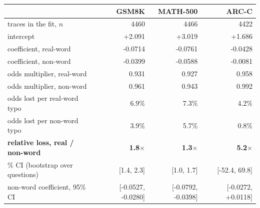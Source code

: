 \begin{tabular}{lrrr}
\toprule
& \textbf{GSM8K} & \textbf{MATH-500} & \textbf{ARC-C} \\
\midrule
traces in the fit, $n$ & 4460 & 4466 & 4422 \\
intercept & +2.091 & +3.019 & +1.686 \\
coefficient, real-word & -0.0714 & -0.0761 & -0.0428 \\
coefficient, non-word & -0.0399 & -0.0588 & -0.0081 \\
odds multiplier, real-word & 0.931 & 0.927 & 0.958 \\
odds multiplier, non-word & 0.961 & 0.943 & 0.992 \\
odds lost per real-word typo & 6.9\% & 7.3\% & 4.2\% \\
odds lost per non-word typo & 3.9\% & 5.7\% & 0.8\% \\
\midrule
\textbf{relative loss, real / non-word} & \textbf{1.8$\times$} & \textbf{1.3$\times$} & \textbf{5.2$\times$} \\
\quad 95\% CI (bootstrap over questions) & [1.4, 2.3] & [1.0, 1.7] & [-52.4, 69.8] \\
non-word coefficient, 95\% CI & [-0.0527, -0.0280] & [-0.0792, -0.0398] & [-0.0272, +0.0118] \\
\bottomrule
\end{tabular}
